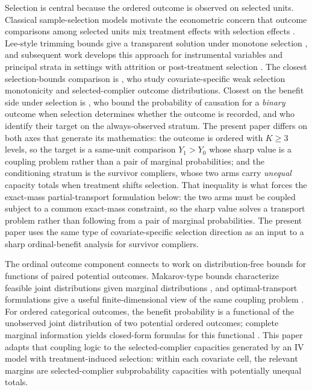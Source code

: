 \documentclass[11pt]{article}
\begin{document}
Selection is central because the ordered outcome is observed on selected units. Classical sample-selection models motivate the econometric concern that outcome comparisons among selected units mix treatment effects with selection effects \citep{Heckman1979}. Lee-style trimming bounds give a transparent solution under monotone selection \citep{Lee2009}, and subsequent work develops this approach for instrumental variables and principal strata in settings with attrition or post-treatment selection \citep{ChenFlores2015,BlancoFloresFloresLagunes2013,ChenFloresFloresLagunes2018,KennedyHarrisKeele2019}. The closest selection-bounds comparison is \citet{DongHeiler2026}, who study covariate-specific weak selection monotonicity and selected-complier outcome distributions. Closest on the benefit side under selection is \citet{PossebomRiva2025}, who bound the probability of causation for a \emph{binary} outcome when selection determines whether the outcome is recorded, and who identify their target on the always-observed stratum. The present paper differs on both axes that generate its mathematics: the outcome is ordered with \(K\ge 3\) levels, so the target is a same-unit comparison \(Y_1>Y_0\) whose sharp value is a coupling problem rather than a pair of marginal probabilities; and the conditioning stratum is the survivor compliers, whose two arms carry \emph{unequal} capacity totals when treatment shifts selection. That inequality is what forces the exact-mass partial-transport formulation below: the two arms must be coupled subject to a common exact-mass constraint, so the sharp value solves a transport problem rather than following from a pair of marginal probabilities. The present paper uses the same type of covariate-specific selection direction as an input to a sharp ordinal-benefit analysis for survivor compliers.

The ordinal outcome component connects to work on distribution-free bounds for functions of paired potential outcomes. Makarov-type bounds characterize feasible joint distributions given marginal distributions \citep{Makarov1982,WilliamsonDowns1990}, and optimal-transport formulations give a useful finite-dimensional view of the same coupling problem \citep{Villani2009,FanPark2010}. For ordered categorical outcomes, the benefit probability is a functional of the unobserved joint distribution of two potential ordered outcomes; complete marginal information yields closed-form formulas for this functional \citep{LuDingDasgupta2018,LuZhangDing2020}. This paper adapts that coupling logic to the selected-complier capacities generated by an IV model with treatment-induced selection: within each covariate cell, the relevant margins are selected-complier subprobability capacities with potentially unequal totals.
\end{document}
